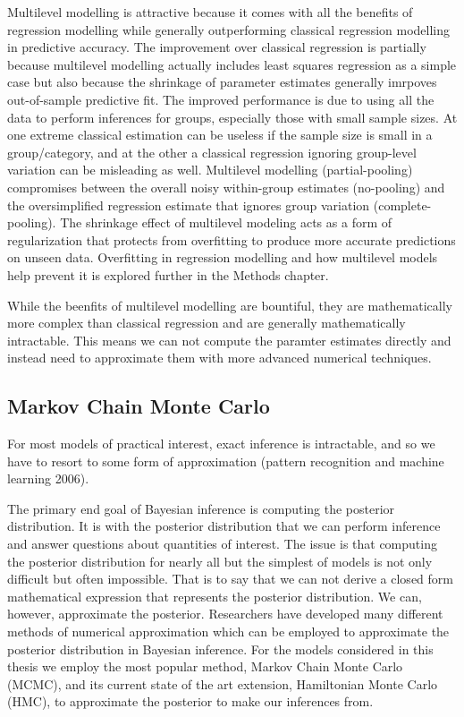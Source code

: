 Multilevel modelling is attractive because it comes with all the benefits of regression modelling while generally outperforming classical regression modelling in predictive accuracy. The improvement over classical regression is partially because multilevel modelling actually includes least squares regression as a simple case but also because the shrinkage of parameter estimates generally imrpoves out-of-sample predictive fit. The improved performance is due to using all the data to perform inferences for groups, especially those with small sample sizes. At one extreme classical estimation can be useless if the sample size is small in a group/category, and at the other a classical regression ignoring group-level variation can be misleading as well. Multilevel modelling (partial-pooling) compromises between the overall noisy within-group estimates (no-pooling) and the oversimplified regression estimate that ignores group variation (complete-pooling). The shrinkage effect of multilevel modeling acts as a form of regularization that protects from overfitting to produce more accurate predictions on unseen data. Overfitting in regression modelling and how multilevel models help prevent it is explored further in the Methods chapter.

While the beenfits of multilevel modelling are bountiful, they are mathematically more complex than classical regression and are generally mathematically intractable. This means we can not compute the paramter estimates directly and instead need to approximate them with more advanced numerical techniques.

\subsection{Markov Chain Monte Carlo}

For most models of practical interest, exact inference is intractable, and so we have to resort to some form of approximation (pattern recognition and machine learning 2006).

The primary end goal of Bayesian inference is computing the posterior distribution. It is with the posterior distribution that we can perform inference and answer questions about quantities of interest. The issue is that computing the posterior distribution for nearly all but the simplest of models is not only difficult but often impossible. That is to say that we can not derive a closed form mathematical expression that represents the posterior distribution. We can, however, approximate the posterior. Researchers have developed many different methods of numerical approximation which can be employed to approximate the posterior distribution in Bayesian inference. For the models considered in this thesis we employ the most popular method, Markov Chain Monte Carlo (MCMC), and its current state of the art extension, Hamiltonian Monte Carlo (HMC), to approximate the posterior to make our inferences from.

